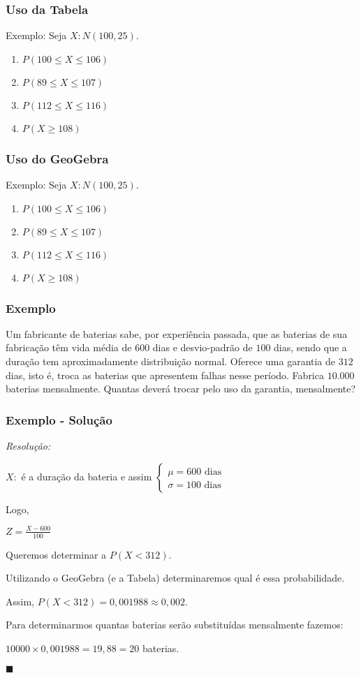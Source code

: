 \documentclass[hyperref={pdfpagelabels=false}]{beamer}
\begin{document}
\begin{frame}
\frametitle{Uso da Tabela}

Exemplo: Seja $X:N(100,25)$.
\begin{enumerate}
	\item $P(100 \leq X \leq 106)$ \pause
	\item $P(89 \leq X \leq 107)$ \pause
	\item $P(112 \leq X \leq 116)$ \pause
	\item $P(X \geq 108)$
\end{enumerate}

\end{frame}

\begin{frame}
	\frametitle{Uso do GeoGebra}
	
	Exemplo: Seja $X:N(100,25)$.
	\begin{enumerate}
		\item $P(100 \leq X \leq 106)$ \pause
		\item $P(89 \leq X \leq 107)$ \pause
		\item $P(112 \leq X \leq 116)$ \pause
		\item $P(X \geq 108)$
	\end{enumerate}
	
\end{frame}

\begin{frame}
\frametitle{Exemplo}

Um fabricante de baterias sabe, por experiência passada, que as baterias de sua fabricação têm vida média de $600$ dias e desvio-padrão de $100$ dias, sendo que a duração tem aproximadamente distribuição normal. Oferece uma garantia de $312$ dias, isto é, troca as baterias que apresentem falhas nesse período. Fabrica $10.000$ baterias mensalmente. Quantas deverá trocar pelo uso da garantia, mensalmente?

\end{frame}

\begin{frame}
\frametitle{Exemplo - Solução}
{\it Resolução:}

\pause
$X:$ é a duração da bateria e assim \pause $\begin{cases}
\mu = 600 \text{ dias} \\
\sigma = 100 \text{ dias}
\end{cases}
$

\pause
Logo,

\pause
$Z = \displaystyle \frac{X - 600}{100}$

\pause
Queremos determinar a $P(X < 312)$. 

\pause
Utilizando o GeoGebra (e a Tabela) determinaremos qual é essa probabilidade.

\pause
Assim, $P(X < 312) = 0,001988 \approx 0,002$. 

\pause
Para determinarmos quantas baterias serão substituídas mensalmente fazemos:

\pause
$10000 \times 0,001988 = 19,88 = 20$ baterias.

\pause
\begin{flushright}
	$\blacksquare$
\end{flushright}
\end{frame}
\end{document}
